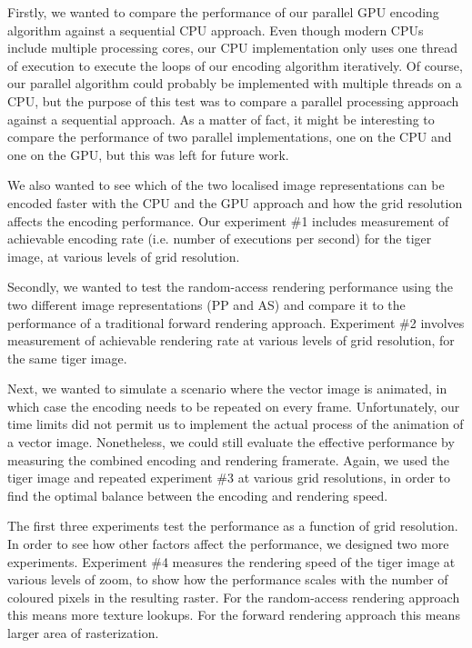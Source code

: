 \documentclass[11pt,a4paper,twoside]{article}
\begin{document}
Firstly, we wanted to compare the performance of our parallel GPU encoding algorithm against a sequential CPU approach. Even though modern CPUs include multiple processing cores, our CPU implementation only uses one thread of execution to execute the loops of our encoding algorithm iteratively. Of course, our parallel algorithm could probably be implemented with multiple threads on a CPU, but the purpose of this test was to compare a parallel processing approach against a sequential approach. As a matter of fact, it might be interesting to compare the performance of two parallel implementations, one on the CPU and one on the GPU, but this was left for future work.

We also wanted to see which of the two localised image representations can be encoded faster with the CPU and the GPU approach and how the grid resolution affects the encoding performance. Our experiment \#1 includes measurement of achievable encoding rate (i.e. number of executions per second) for the tiger image, at various levels of grid resolution.

Secondly, we wanted to test the random-access rendering performance using the two different image representations (PP and AS) and compare it to the performance of a traditional forward rendering approach. Experiment \#2 involves measurement of achievable rendering rate at various levels of grid resolution, for the same tiger image.

Next, we wanted to simulate a scenario where the vector image is animated, in which case the encoding needs to be repeated on every frame. Unfortunately, our time limits did not permit us to implement the actual process of the animation of a vector image. Nonetheless, we could still evaluate the effective performance by measuring the combined encoding and rendering framerate. Again, we used the tiger image and repeated experiment \#3 at various grid resolutions, in order to find the optimal balance between the encoding and rendering speed.

The first three experiments test the performance as a function of grid resolution. In order to see how other factors affect the performance, we designed two more experiments. Experiment \#4 measures the rendering speed of the tiger image at various levels of zoom, to show how the performance scales with the number of coloured pixels in the resulting raster. For the random-access rendering approach this means more texture lookups. For the forward rendering approach this means larger area of rasterization.
\end{document}
